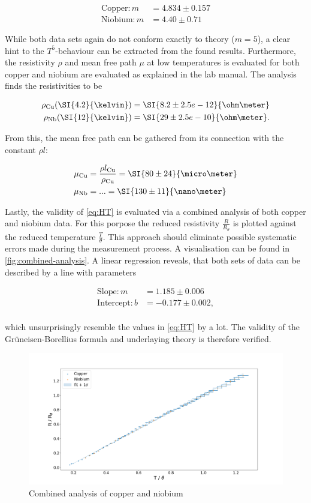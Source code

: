 \begin{align*}
\label{eq:fitparams-slope-metal}
\text{Copper}: m &= 4.834 \pm 0.157 \\
\text{Niobium}: m &= 4.40 \pm 0.71
\end{align*}

While both data sets again do not conform exactly to theory ($m=5$), a clear hint to 
the $T^5$-behaviour can be extracted from the found results. Furthermore, the 
resistivity $\rho$ and mean free path $\mu$ at low temperatures is evaluated for both
copper and niobium are evaluated as explained in the lab manual. The analysis finds
the resistivities to be

\begin{align*}
	\rho_\text{Cu}(\SI{4.2}{\kelvin}) &= \SI{8.2\pm2.5e-12}{\ohm\meter} \\
	\rho_\text{Nb}(\SI{12}{\kelvin}) &= \SI{29\pm2.5e-10}{\ohm\meter}. \\
\end{align*}

From this, the mean free path can be gathered from its connection with the constant 
$\rho l$:

\begin{align*}
	\mu_\text{Cu} &= \frac{\rho l_\text{Cu}}{\rho_\text{Cu}} = \SI{80\pm24}{\micro\meter} \\
	\mu_\text{Nb} &= ... = \SI{130\pm11}{\nano\meter} \\ 
\end{align*}

Lastly, the validity of \autoref{eq:HT} is evaluated via a combined analysis of both 
copper and niobium data. For this porpose the reduced resistivity 
$\frac{R}{R_\theta}$ is plotted against the reduced temperature $\frac{T}{\theta}$. 
This approach should eliminate possible systematic errors made during the measurement
process. A visualisation can be found in \autoref{fig:combined-analysis}. A linear 
regression reveals, that both sets of data can be described by a line with parameters

\begin{align*}
\text{Slope}: m &= 1.185\pm0.006 \\
\text{Intercept}: b &= -0.177\pm0.002, \\
\end{align*}

which unsurprisingly resemble the values in \autoref{eq:HT} by a lot. The validity of
the Grüneisen-Borellius formula and underlaying theory is therefore verified.

\begin{figure}
	\centering
	\includegraphics[width=1.0\textwidth]{./fig/combined_analysis.png}
	\caption{Combined analysis of copper and niobium}
	\label{fig:combined-analysis}
\end{figure}
